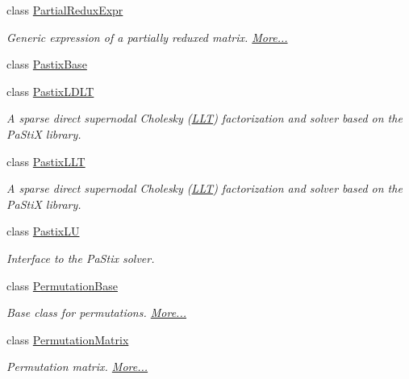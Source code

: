\begin{DoxyCompactItemize}
class \hyperlink{group___core___module_class_eigen_1_1_partial_redux_expr}{Partial\+Redux\+Expr}
\begin{DoxyCompactList}\small\item\em Generic expression of a partially reduxed matrix.  \hyperlink{group___core___module_class_eigen_1_1_partial_redux_expr}{More...}\end{DoxyCompactList}\item 
class \hyperlink{class_eigen_1_1_pastix_base}{Pastix\+Base}
\item 
class \hyperlink{class_eigen_1_1_pastix_l_d_l_t}{Pastix\+L\+D\+LT}
\begin{DoxyCompactList}\small\item\em A sparse direct supernodal Cholesky (\hyperlink{group___cholesky___module_class_eigen_1_1_l_l_t}{L\+LT}) factorization and solver based on the Pa\+StiX library. \end{DoxyCompactList}\item 
class \hyperlink{class_eigen_1_1_pastix_l_l_t}{Pastix\+L\+LT}
\begin{DoxyCompactList}\small\item\em A sparse direct supernodal Cholesky (\hyperlink{group___cholesky___module_class_eigen_1_1_l_l_t}{L\+LT}) factorization and solver based on the Pa\+StiX library. \end{DoxyCompactList}\item 
class \hyperlink{class_eigen_1_1_pastix_l_u}{Pastix\+LU}
\begin{DoxyCompactList}\small\item\em Interface to the Pa\+Stix solver. \end{DoxyCompactList}\item 
class \hyperlink{group___core___module_class_eigen_1_1_permutation_base}{Permutation\+Base}
\begin{DoxyCompactList}\small\item\em Base class for permutations.  \hyperlink{group___core___module_class_eigen_1_1_permutation_base}{More...}\end{DoxyCompactList}\item 
class \hyperlink{group___core___module_class_eigen_1_1_permutation_matrix}{Permutation\+Matrix}
\begin{DoxyCompactList}\small\item\em Permutation matrix.  \hyperlink{group___core___module_class_eigen_1_1_permutation_matrix}{More...}\end{DoxyCompactList}\item 

\end{DoxyCompactItemize}
